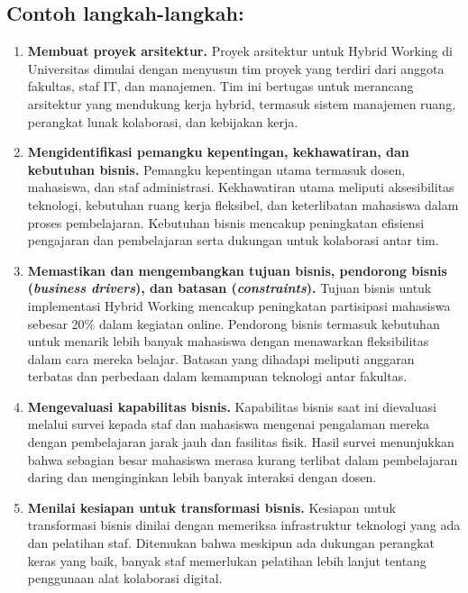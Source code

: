 \subsection*{Contoh langkah-langkah:}
\begin{enumerate}
	\item \textbf{Membuat proyek arsitektur.} 
	Proyek arsitektur untuk Hybrid Working di Universitas dimulai dengan menyusun tim proyek yang terdiri dari anggota fakultas, staf IT, dan manajemen. Tim ini bertugas untuk merancang arsitektur yang mendukung kerja hybrid, termasuk sistem manajemen ruang, perangkat lunak kolaborasi, dan kebijakan kerja.
	
	\item \textbf{Mengidentifikasi pemangku kepentingan, kekhawatiran, dan kebutuhan bisnis.} 
	Pemangku kepentingan utama termasuk dosen, mahasiswa, dan staf administrasi. Kekhawatiran utama meliputi aksesibilitas teknologi, kebutuhan ruang kerja fleksibel, dan keterlibatan mahasiswa dalam proses pembelajaran. Kebutuhan bisnis mencakup peningkatan efisiensi pengajaran dan pembelajaran serta dukungan untuk kolaborasi antar tim.
	
	\item \textbf{Memastikan dan mengembangkan tujuan bisnis, pendorong bisnis (\textit{business dri\-vers}), dan batasan (\textit{constraints}).} 
	Tujuan bisnis untuk implementasi Hybrid Working mencakup peningkatan partisipasi mahasiswa sebesar 20\% dalam kegiatan online. Pendorong bisnis termasuk kebutuhan untuk menarik lebih banyak mahasiswa dengan menawarkan fleksibilitas dalam cara mereka belajar. Batasan yang dihadapi meliputi anggaran terbatas dan perbedaan dalam kemampuan teknologi antar fakultas.
	
	\item \textbf{Mengevaluasi kapabilitas bisnis.} 
	Kapabilitas bisnis saat ini dievaluasi melalui survei kepada staf dan mahasiswa mengenai pengalaman mereka dengan pembelajaran jarak jauh dan fasilitas fisik. Hasil survei menunjukkan bahwa sebagian besar mahasiswa merasa kurang terlibat dalam pembelajaran daring dan menginginkan lebih banyak interaksi dengan dosen.
	
	\item \textbf{Menilai kesiapan untuk transformasi bisnis.} 
	Kesiapan untuk transformasi bisnis dinilai dengan memeriksa infrastruktur teknologi yang ada dan pelatihan staf. Ditemukan bahwa meskipun ada dukungan perangkat keras yang baik, banyak staf memerlukan pelatihan lebih lanjut tentang penggunaan alat kolaborasi digital.
	

\end{enumerate}
